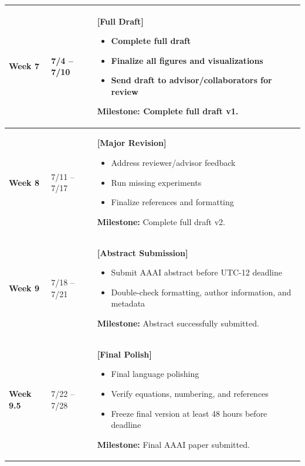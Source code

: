 \documentclass[11pt]{article}
\begin{document}
\begin{longtable}{p{1.8cm} p{2.3cm} p{10.5cm}}
\midrule

\textbf{Week 7} & 7/4 -- 7/10 &
\textbf{[Full Draft]}
\begin{itemize}[leftmargin=1.5em]
    \item Complete full draft
    \item Finalize all figures and visualizations
    \item Send draft to advisor/collaborators for review
\end{itemize}

\textbf{Milestone:}
Complete full draft v1.
\\

\midrule

\textbf{Week 8} & 7/11 -- 7/17 &
\textbf{[Major Revision]}
\begin{itemize}[leftmargin=1.5em]
    \item Address reviewer/advisor feedback
    \item Run missing experiments
    \item Finalize references and formatting
\end{itemize}

\textbf{Milestone:}
Complete full draft v2.
\\

\midrule

\textbf{Week 9} & 7/18 -- 7/21 &
\textbf{[Abstract Submission]}
\begin{itemize}[leftmargin=1.5em]
    \item Submit AAAI abstract before UTC-12 deadline
    \item Double-check formatting, author information, and metadata
\end{itemize}

\textbf{Milestone:}
Abstract successfully submitted.
\\

\midrule

\textbf{Week 9.5} & 7/22 -- 7/28 &
\textbf{[Final Polish]}
\begin{itemize}[leftmargin=1.5em]
    \item Final language polishing
    \item Verify equations, numbering, and references
    \item Freeze final version at least 48 hours before deadline
\end{itemize}

\textbf{Milestone:}
Final AAAI paper submitted.
\\


\end{longtable}
\end{document}
